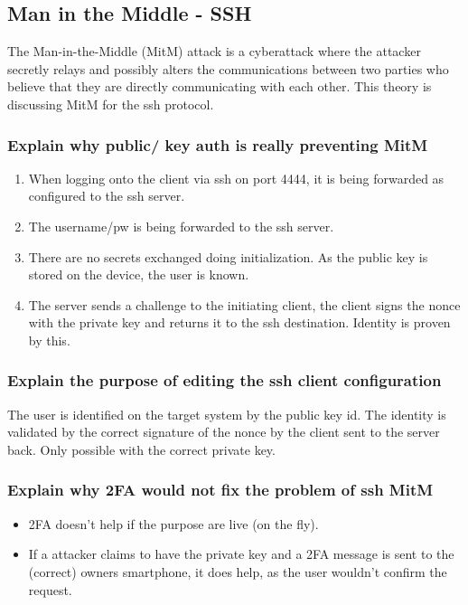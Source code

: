 \subsection{Man in the Middle - SSH}
The Man-in-the-Middle (MitM) attack is a cyberattack where the attacker secretly relays and possibly alters the communications between two parties who believe that they are directly communicating with each other. This theory is discussing MitM for the ssh protocol.

\subsubsection{Explain why public/ key auth is really preventing MitM}

\begin{enumerate}
    \item When logging onto the client via ssh on port 4444, it is being forwarded as configured to the ssh server.
    \item The username/pw is being forwarded to the ssh server.
    \item There are no secrets exchanged doing initialization. As the public key is stored on the device, the user is \glqq known\grqq.
    \item The server sends a challenge to the initiating client, the client signs the nonce with the private key and returns it to the ssh destination. Identity is proven by this.
\end{enumerate}

\subsubsection{Explain the purpose of editing the ssh client configuration}
The user is identified on the target system by the public key id. The identity is validated by the correct signature of the nonce by the client sent to the server back. Only possible with the correct private key.

\subsubsection{Explain why 2FA would not fix the problem of ssh MitM}
\begin{itemize}
    \item 2FA doesn't help if the purpose are live (on the fly).
    \item If a attacker claims to have the private key and a 2FA message is sent to the (correct) owners smartphone, it does help, as the user wouldn't confirm the request.
\end{itemize}

